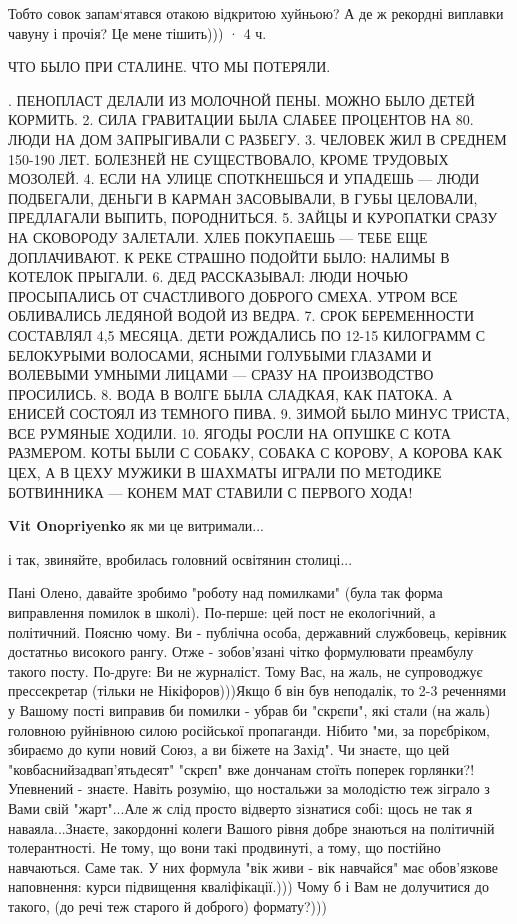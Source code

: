 \begin{itemize}
\begin{itemize}
\end{itemize} %

Тобто совок запам‘ятався отакою відкритою хуйньою? А де ж рекордні виплавки чавуну і прочія? Це мене тішить)))
 · 4 ч.

ЧТО БЫЛО ПРИ СТАЛИНЕ. ЧТО МЫ ПОТЕРЯЛИ.

. ПЕНОПЛАСТ ДЕЛАЛИ ИЗ МОЛОЧНОЙ ПЕНЫ. МОЖНО БЫЛО ДЕТЕЙ КОРМИТЬ.
2. СИЛА ГРАВИТАЦИИ БЫЛА СЛАБЕЕ ПРОЦЕНТОВ НА 80. ЛЮДИ НА ДОМ ЗАПРЫГИВАЛИ С РАЗБЕГУ.
3. ЧЕЛОВЕК ЖИЛ В СРЕДНЕМ 150-190 ЛЕТ. БОЛЕЗНЕЙ НЕ СУЩЕСТВОВАЛО, КРОМЕ ТРУДОВЫХ МОЗОЛЕЙ.
4. ЕСЛИ НА УЛИЦЕ СПОТКНЕШЬСЯ И УПАДЕШЬ — ЛЮДИ ПОДБЕГАЛИ, ДЕНЬГИ В КАРМАН ЗАСОВЫВАЛИ, В ГУБЫ ЦЕЛОВАЛИ, ПРЕДЛАГАЛИ ВЫПИТЬ, ПОРОДНИТЬСЯ.
5. ЗАЙЦЫ И КУРОПАТКИ СРАЗУ НА СКОВОРОДУ ЗАЛЕТАЛИ.
ХЛЕБ ПОКУПАЕШЬ — ТЕБЕ ЕЩЕ ДОПЛАЧИВАЮТ.
К РЕКЕ СТРАШНО ПОДОЙТИ БЫЛО: НАЛИМЫ В КОТЕЛОК ПРЫГАЛИ.
6. ДЕД РАССКАЗЫВАЛ: ЛЮДИ НОЧЬЮ ПРОСЫПАЛИСЬ ОТ СЧАСТЛИВОГО ДОБРОГО СМЕХА. УТРОМ ВСЕ ОБЛИВАЛИСЬ ЛЕДЯНОЙ ВОДОЙ ИЗ ВЕДРА.
7. СРОК БЕРЕМЕННОСТИ СОСТАВЛЯЛ 4,5 МЕСЯЦА. ДЕТИ РОЖДАЛИСЬ ПО 12-15 КИЛОГРАММ С БЕЛОКУРЫМИ ВОЛОСАМИ, ЯСНЫМИ ГОЛУБЫМИ ГЛАЗАМИ И ВОЛЕВЫМИ УМНЫМИ ЛИЦАМИ — СРАЗУ НА ПРОИЗВОДСТВО ПРОСИЛИСЬ.
8. ВОДА В ВОЛГЕ БЫЛА СЛАДКАЯ, КАК ПАТОКА. А ЕНИСЕЙ СОСТОЯЛ ИЗ ТЕМНОГО ПИВА.
9. ЗИМОЙ БЫЛО МИНУС ТРИСТА, ВСЕ РУМЯНЫЕ ХОДИЛИ.
10. ЯГОДЫ РОСЛИ НА ОПУШКЕ С КОТА РАЗМЕРОМ. КОТЫ БЫЛИ С СОБАКУ, СОБАКА С КОРОВУ, А КОРОВА КАК ЦЕХ, А В ЦЕХУ МУЖИКИ В ШАХМАТЫ ИГРАЛИ ПО МЕТОДИКЕ БОТВИННИКА — КОНЕМ МАТ СТАВИЛИ С ПЕРВОГО ХОДА!
\restorecr

\textbf{Vit Onopriyenko} як ми це витримали...

і так, звиняйте, вробилась головний освітянин столиці...


Пані Олено, давайте зробимо "роботу над помилками" (була так форма виправлення
помилок в школі). По-перше: цей пост не екологічний, а політичний. Поясню чому.
Ви - публічна особа, державний службовець, керівник достатньо високого рангу.
Отже - зобов'язані чітко формулювати преамбулу такого посту. По-друге: Ви не
журналіст. Тому Вас, на жаль, не супроводжує прессекретар (тільки не
Нікіфоров)))Якщо б він був неподалік, то 2-3 реченнями у Вашому пості виправив
би помилки - убрав би "скрєпи", які стали (на жаль) головною руйнівною силою
російської пропаганди. Нібито "ми, за порєбріком, збираємо до купи новий Союз,
а ви біжете на Захід". Чи знаєте, що цей "ковбаснийзадвап'ятьдесят" "скрєп" вже
дончанам стоїть поперек горлянки?! Упевнений - знаєте. Навіть розумію, що
ностальжи за молодістю теж зіграло з Вами свій "жарт"...Але ж слід просто
відверто зізнатися собі: щось не так я наваяла...Знаєте, закордонні колеги
Вашого рівня добре знаються на політичній толерантності. Не тому, що вони такі
продвинуті, а тому, що постійно навчаються. Саме так. У них формула "вік живи -
вік навчайся" має обов'язкове наповнення: курси підвищення кваліфікації.)))
Чому б і Вам не долучитися до такого, (до речі теж старого й доброго)
формату?)))



\end{itemize}
